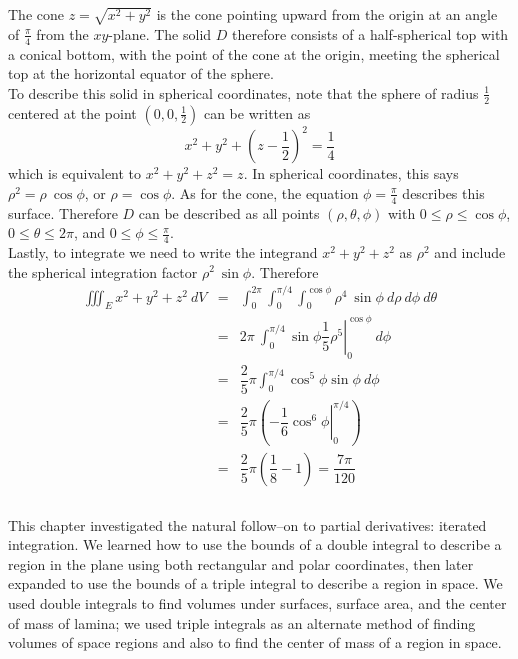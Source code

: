 {The cone $z = \sqrt{x^2 + y^2}$ is the cone pointing upward from the origin at an angle of $\frac{\pi}{4}$ from the $xy$-plane. The solid $D$ therefore consists of a half-spherical top with a conical bottom, with the point of the cone at the origin, meeting the spherical top at the horizontal equator of the sphere.\\

To describe this solid in spherical coordinates, note that the sphere of radius $\frac{1}{2}$ centered at the point $\left( 0,0,\frac{1}{2}\right)$ can be written as $$x^2 + y^2 + \left( z - \frac{1}{2}\right)^2 = \frac{1}{4}$$ which is equivalent to $x^2 + y^2 + z^2 = z$. In spherical coordinates, this says $\rho^2 = \rho \: \cos\phi$, or $\rho = \cos\phi$.  As for the cone, the equation $\phi = \frac{\pi}{4}$ describes this surface.  Therefore $D$ can be described as all points $\left( \rho, \theta,\phi\right)$ with $0 \leq \rho \leq \cos\phi$, $0 \leq \theta \leq 2\pi$, and $0 \leq \phi \leq \frac{\pi}{4}$.  \\

Lastly, to integrate we need to write the integrand $x^2 + y^2 + z^2$ as $\rho^2$ and include the spherical integration factor $\rho^2 \: \sin\phi$.  Therefore
\begin{eqnarray*}
\iiint_E x^2 + y^2 + z^2 \: dV & = & \int_0^{2\pi} \int_0^{\pi/4} \int_0^{\cos\phi} \rho^4 \: \sin\phi \: d\rho \: d\phi \: d\theta \\
 & = & 2\pi \: \int_0^{\pi/4} \sin\phi \left. \dfrac{1}{5} \rho^5 \right|_{0}^{\cos\phi} \: d\phi \\
 & = & \dfrac{2}{5}\pi \int_0^{\pi/4} \cos^5\phi \sin\phi \: d\phi \\
 & = & \dfrac{2}{5}\pi \left(\left. -\dfrac{1}{6}\cos^6\phi \right|_{0}^{\pi/4}\right) \\
 & = & \dfrac{2}{5}\pi \left( \dfrac{1}{8} - 1 \right) = \dfrac{7\pi}{120} \\
\end{eqnarray*}
}\\

This chapter investigated the natural follow--on to partial derivatives: iterated integration. We learned how to use the bounds of a double integral to describe a region in the plane using both rectangular and polar coordinates, then later expanded to use the bounds of a triple integral to describe a region in space. We used double integrals to find volumes under surfaces, surface area, and the center of mass of lamina; we used triple integrals as an alternate method of finding volumes of space regions and also to find the center of mass of a region in space.


